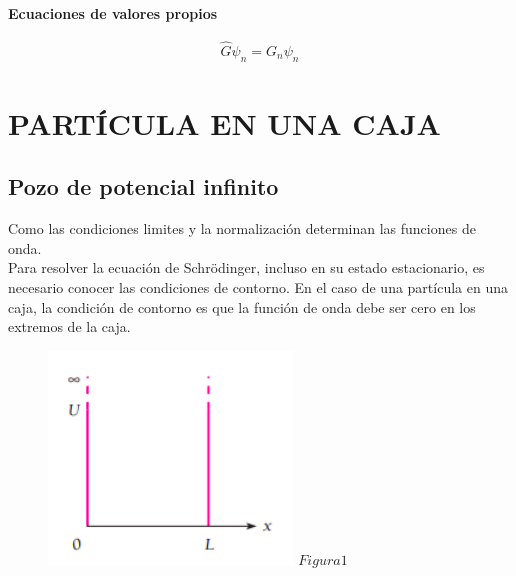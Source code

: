 \documentclass[a4paper]{article}
\begin{document}
    \begin{minipage}[c]{7.5cm}

        \vspace{0.5cm}
        \centering
        \textbf{Ecuaciones de valores propios}
        \vspace{-5mm}

        \begin{align*}
            \hat{G} \psi_n = G_n \psi_n
        \end{align*}
    \end{minipage}

    \section{PARTÍCULA EN UNA CAJA}

        \subsection{Pozo de potencial infinito}

        \indent Como las condiciones limites y la normalización determinan las funciones de onda.\\
        \indent Para resolver la ecuación de Schrödinger, incluso en su estado estacionario, es necesario conocer las condiciones de contorno. En el caso de una partícula en una caja, la condición de contorno es que la función de onda debe ser cero en los extremos de la caja.\\

        \begin{figure}[h!]
            \centering
            \includegraphics[width=6.5cm]{../../imagenes/pozo_potencial_infinito.png}
            \vspace{-0.5mm}
            \textbf{$Figura 1$} 
        \end{figure}
        
        \saltoPag
\end{document}
